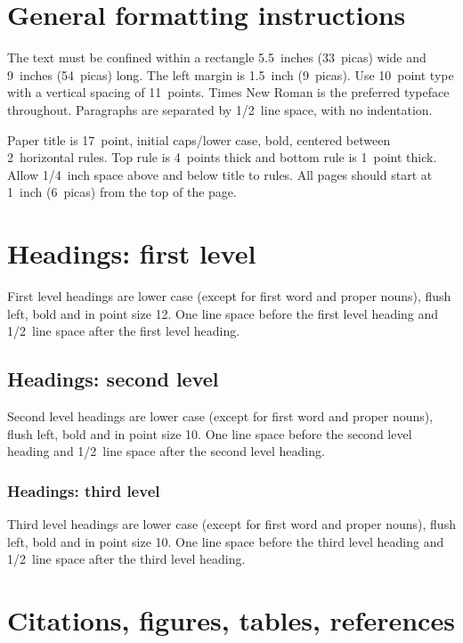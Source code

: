 \documentclass{article} %
\begin{document}
\section{General formatting instructions}
\label{gen_inst}

The text must be confined within a rectangle 5.5~inches (33~picas) wide and
9~inches (54~picas) long. The left margin is 1.5~inch (9~picas).
Use 10~point type with a vertical spacing of 11~points. Times New Roman is the
preferred typeface throughout. Paragraphs are separated by 1/2~line space,
with no indentation.

Paper title is 17~point, initial caps/lower case, bold, centered between
2~horizontal rules. Top rule is 4~points thick and bottom rule is 1~point
thick. Allow 1/4~inch space above and below title to rules. All pages should
start at 1~inch (6~picas) from the top of the page.


\section{Headings: first level}
\label{headings}

First level headings are lower case (except for first word and proper nouns),
flush left, bold and in point size 12. One line space before the first level
heading and 1/2~line space after the first level heading.

\subsection{Headings: second level}

Second level headings are lower case (except for first word and proper nouns),
flush left, bold and in point size 10. One line space before the second level
heading and 1/2~line space after the second level heading.

\subsubsection{Headings: third level}

Third level headings are lower case (except for first word and proper nouns),
flush left, bold and in point size 10. One line space before the third level
heading and 1/2~line space after the third level heading.

\section{Citations, figures, tables, references}
\label{others}
\end{document}
